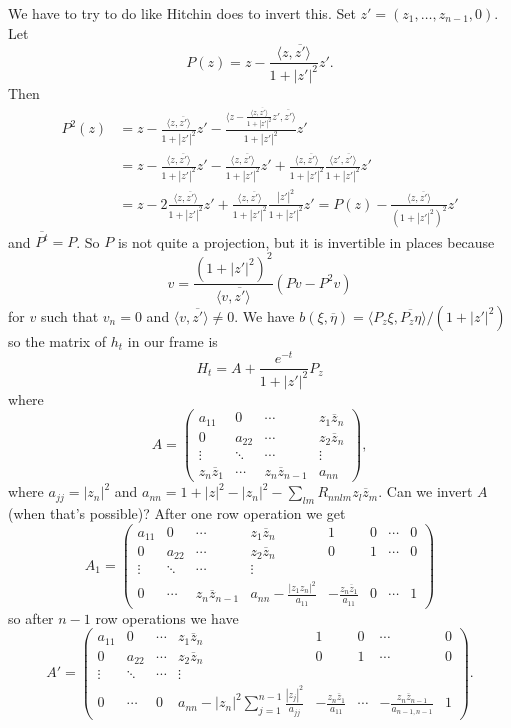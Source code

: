 \documentclass[10pt,a4paper]{amsart}
\def\<{\langle}
\def\>{\rangle}
\def\ov#1{\overline{#1}}
\begin{document}
We have to try to do like Hitchin does to invert this.
Set $z' = (z_1,\ldots,z_{n-1},0)$. Let
$$
P(z) = z - \frac{\< z, \ov{z'} \>}{1 + |z'|^2} z'.
$$
Then
\begin{align*}
P^2(z)
&= z - \frac{\< z, \ov{z'} \>}{1 + |z'|^2} z'
- \frac{\< z - \frac{\< z, \ov{z'} \>}{1 + |z'|^2} z', \ov{z'} \>}{1 + |z'|^2} z'
\\
&= z - \frac{\< z, \ov{z'} \>}{1 + |z'|^2} z'
- \frac{\< z, \ov{z'} \>}{1 + |z'|^2} z'
+ \frac{\< z, \ov{z'} \>}{1 + |z'|^2} \frac{\< z', \ov{z'} \>}{1 + |z'|^2} z'
\\
&= z - 2 \frac{\< z, \ov{z'} \>}{1 + |z'|^2} z'
+ \frac{\< z, \ov{z'} \>}{1 + |z'|^2} \frac{|z'|^2}{1 + |z'|^2} z'
= P(z)
- \frac{\< z, \ov{z'} \>}{(1 + |z'|^2)^2} z'
\end{align*}
and $\ov{P^t} = P$.
So $P$ is not quite a projection, but it is invertible in places because
$$
v = \frac{(1 + |z'|^2)^2}{\< v, \ov{z'} \>}
(Pv - P^2 v)
$$
for $v$ such that $v_n = 0$ and $\<v, \ov{z'}\> \not= 0$.
We have
$
b(\xi, \ov\eta) = \< P_z \xi, \ov{P_z \eta} \> / (1+|z'|^2)
$
so the matrix of $h_t$ in our frame is
$$
H_t = A + \frac{e^{-t}}{1 + |z'|^2} P_z
$$
where
$$
A = \begin{pmatrix}
a_{11} & 0  & \cdots & z_1 \ov z_n
\\
0 & a_{22} & \cdots & z_2 \ov z_n
\\
\vdots & \ddots & \cdots & \vdots
\\
z_n \ov z_1 & \cdots & z_n \ov z_{n-1} & a_{nn}
\end{pmatrix},
$$
where $a_{jj} = |z_n|^2$ and
$a_{nn} = 1 + |z|^2 - |z_n|^2 - \sum_{lm} R_{nnlm} z_l \ov z_m$.
Can we invert $A$ (when that's possible)?
After one row operation we get
$$
A_1 =
\left(
\begin{array}{cccc|cccc}
a_{11} & 0 & \cdots & z_1 \ov z_n
&
1 & 0 & \cdots & 0
\\
0 & a_{22} & \cdots & z_2 \ov z_n
&
0 & 1 & \cdots & 0
\\
\vdots & \ddots & \cdots & \vdots
\\
0 & \cdots & z_{n} \ov z_{n-1} & a_{nn} - \frac{|z_1 z_n|^2}{a_{11}}
&
- \frac{z_n \ov z_1}{a_{11}} & 0 & \cdots & 1
\end{array}
\right)
$$
so after $n-1$ row operations we have
$$
A' =
\left(
\begin{array}{cccc|cccc}
a_{11} & 0 & \cdots & z_1 \ov z_n
&
1 & 0 & \cdots & 0
\\
0 & a_{22} & \cdots & z_2 \ov z_n
&
0 & 1 & \cdots & 0
\\
\vdots & \ddots & \cdots & \vdots
\\
0 & \cdots & 0 & a_{nn} - |z_n|^2 \sum_{j=1}^{n-1} \frac{|z_j|^2}{a_{jj}}
&
-\frac{z_n \ov z_1}{a_{11}} & \cdots & -\frac{z_{n} \ov z_{n-1}}{a_{n-1,n-1}} & 1
\end{array}
\right).
$$
\end{document}
